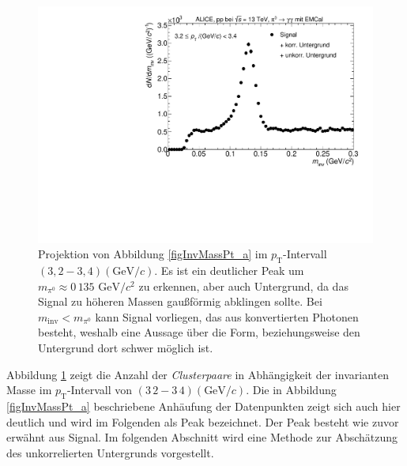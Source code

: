 \begin{figure}[tbp]
\centering
\includegraphics[width=.75\linewidth]{hSignalPlusBkg.pdf}
\caption{Projektion von Abbildung \ref{figInvMassPt_a} im $p_{\text{T}}$-Intervall $(3,2 - 3,4) (\text{GeV/}c)$. Es ist ein deutlicher Peak um $m_{\pi^{0}} \approx 0\,135\text{ GeV/}c^{2}$ zu erkennen, aber auch Untergrund, da das Signal zu höheren Massen gaußförmig abklingen sollte. Bei $m_{\text{inv}} < m_{\pi^{0}}$ kann Signal vorliegen, das aus konvertierten Photonen besteht, weshalb eine Aussage über die Form, beziehungsweise den Untergrund dort schwer möglich ist.}
\label{figSignalPlusBkg}
\end{figure}
\newline
Abbildung \ref{figSignalPlusBkg} zeigt die Anzahl der \textit{Clusterpaare} in Abhängigkeit der invarianten Masse im $p_{\text{T}}$-Intervall von $(3\,2 - 3\,4)(\text{GeV}/c)$.
Die in Abbildung \ref{figInvMassPt_a} beschriebene Anhäufung der Datenpunkten zeigt sich auch hier deutlich und wird im Folgenden als Peak bezeichnet.
Der Peak besteht wie zuvor erwähnt aus Signal.
\newline
Im folgenden Abschnitt wird eine Methode zur Abschätzung des unkorrelierten Untergrunds vorgestellt. 